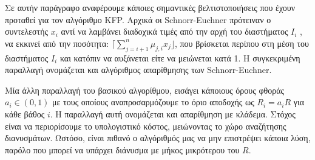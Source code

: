 Σε αυτήν παράγραφο αναφέρουμε κάποιες σημαντικές βελτιστοποιήσεις που έχουν προταθεί για τον αλγόριθμο KFP. Αρχικά οι \lt Schnorr-Euchner πρότειναν ο συντελεστής $ x_i $ αντί να λαμβάνει διαδοχικά τιμές από την αρχή του διαστήματος $ I_i $ , να εκκινεί από την ποσότητα: $ \lceil \sum_{j=i+1}^n μ_{j,i} x_j \rfloor $, που βρίσκεται περίπου στη μέση του διαστήματος $ I_i $ και κατόπιν να αυξάνεται είτε να μειώνεται κατά 1. Η συγκεκριμένη παραλλαγή ονομάζεται και αλγόριθμος απαρίθμησης των Schnorr-Euchner.

Μία άλλη παραλλαγή του βασικού αλγορίθμου, εισάγει κάποιους όρους φθοράς $ a_i \in (0,1) $ με τους οποίους αναπροσαρμόζουμε το όριο αποδοχής ως $ R_i = a_iR $ για κάθε βάθος $ i $. Η παραλλαγή αυτή ονομάζεται και απαρίθμηση με κλάδεμα. Στόχος είναι να περιορίσουμε το υπολογιστικό κόστος, μειώνοντας το χώρο αναζήτησης διανυσμάτων. Ωστόσο, είναι πιθανό ο αλγόριθμός μας να μην επιστρέψει κάποια λύση, παρόλο που μπορεί να υπάρχει διάνυσμα με μήκος μικρότερου του $ R $.  



